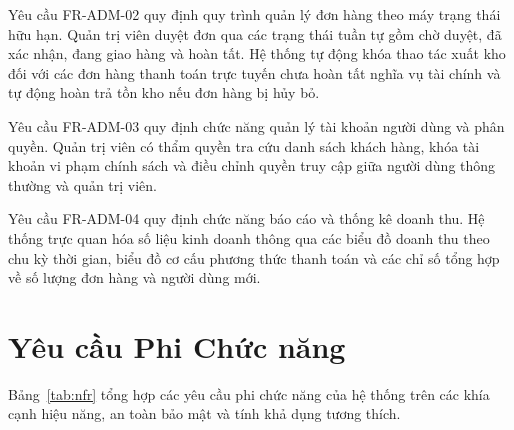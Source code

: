 Yêu cầu FR-ADM-02 quy định quy trình quản lý đơn hàng theo máy trạng thái hữu hạn. Quản trị viên duyệt đơn qua các trạng thái tuần tự gồm chờ duyệt, đã xác nhận, đang giao hàng và hoàn tất. Hệ thống tự động khóa thao tác xuất kho đối với các đơn hàng thanh toán trực tuyến chưa hoàn tất nghĩa vụ tài chính và tự động hoàn trả tồn kho nếu đơn hàng bị hủy bỏ.

Yêu cầu FR-ADM-03 quy định chức năng quản lý tài khoản người dùng và phân quyền. Quản trị viên có thẩm quyền tra cứu danh sách khách hàng, khóa tài khoản vi phạm chính sách và điều chỉnh quyền truy cập giữa người dùng thông thường và quản trị viên.

Yêu cầu FR-ADM-04 quy định chức năng báo cáo và thống kê doanh thu. Hệ thống trực quan hóa số liệu kinh doanh thông qua các biểu đồ doanh thu theo chu kỳ thời gian, biểu đồ cơ cấu phương thức thanh toán và các chỉ số tổng hợp về số lượng đơn hàng và người dùng mới.

\section{Yêu cầu Phi Chức năng}
Bảng~\ref{tab:nfr} tổng hợp các yêu cầu phi chức năng của hệ thống trên các khía cạnh hiệu năng, an toàn bảo mật và tính khả dụng tương thích.

